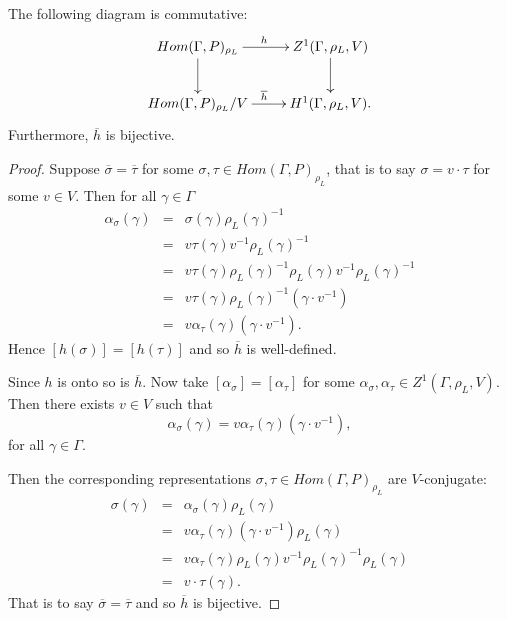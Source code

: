 \begin{lemma}
  The following diagram is commutative:
  \begin{displaymath}
    \xymatrix{
    Hom(\Gamma, P)_{\rho_L} \ar[r]^h \ar[d] & Z^{1}(\Gamma, \rho_L, V) \ar[d] \\
    Hom(\Gamma, P)_{\rho_L}/V \ar[r]^{\overline{h}} & H^{1}(\Gamma, \rho_L, V).
    }
  \end{displaymath}
  Furthermore, $\overline{h}$ is bijective.
  \label{lem:v_h1}
\end{lemma}
\begin{proof}  
  Suppose $\overline{\sigma} = \overline{\tau}$ for some $\sigma,\tau\in Hom(\Gamma, P)_{\rho_L}$, that is to say $\sigma = v\cdot\tau$ for some $v\in V$. Then for all $\gamma\in \Gamma$
  \begin{eqnarray*}
    \alpha_\sigma(\gamma) &=& \sigma(\gamma)\rho_L(\gamma)^{-1}\\
    &=& v\tau(\gamma)v^{-1}\rho_L(\gamma)^{-1}\\
    &=& v\tau(\gamma)\rho_L(\gamma)^{-1}\rho_L(\gamma)v^{-1}\rho_L(\gamma)^{-1}\\
    &=& v\tau(\gamma)\rho_L(\gamma)^{-1}(\gamma\cdot v^{-1})\\
    &=& v\alpha_\tau(\gamma)(\gamma\cdot v^{-1}).
  \end{eqnarray*}
  Hence $[h(\sigma)] = [h(\tau)]$ and so $\overline{h}$ is well-defined. 
  
  Since $h$ is onto so is $\overline{h}$. Now take $[\alpha_\sigma] = [\alpha_\tau]$ for some $\alpha_\sigma, \alpha_\tau \in Z^1(\Gamma, \rho_L, V)$. Then there exists $v \in V$ such that
  \begin{displaymath}
    \alpha_\sigma(\gamma) = v \alpha_\tau(\gamma)(\gamma \cdot v^{-1}),
  \end{displaymath}
  for all $\gamma \in \Gamma$.

  Then the corresponding representations $\sigma, \tau \in Hom(\Gamma, P)_{\rho_L}$ are $V$-conjugate:
  \begin{eqnarray*}
    \sigma(\gamma) &=&  \alpha_\sigma(\gamma)\rho_L(\gamma) \\
    &=& v \alpha_\tau(\gamma)(\gamma \cdot v^{-1}) \rho_L(\gamma) \\
    &=& v \alpha_\tau(\gamma)\rho_L(\gamma) v^{-1} \rho_L(\gamma)^{-1} \rho_L(\gamma) \\
    &=& v \cdot \tau(\gamma).
  \end{eqnarray*}
  That is to say $\overline{\sigma} = \overline{\tau}$ and so $\overline{h}$ is bijective.
\end{proof}

